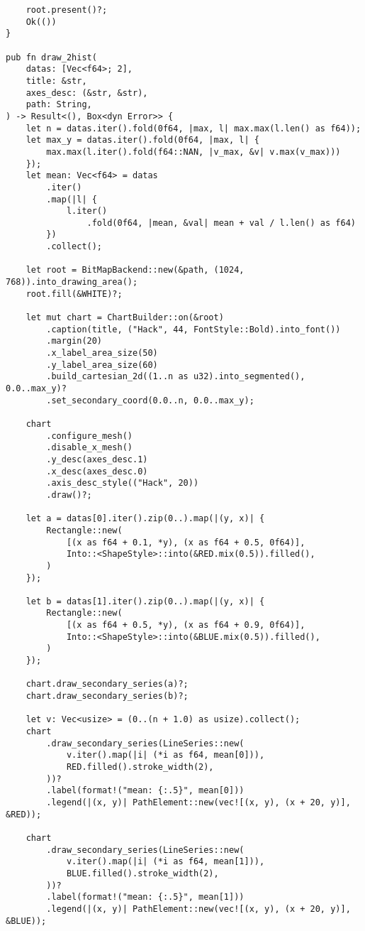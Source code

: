 \begin{verbatim}
    root.present()?;
    Ok(())
}

pub fn draw_2hist(
    datas: [Vec<f64>; 2],
    title: &str,
    axes_desc: (&str, &str),
    path: String,
) -> Result<(), Box<dyn Error>> {
    let n = datas.iter().fold(0f64, |max, l| max.max(l.len() as f64));
    let max_y = datas.iter().fold(0f64, |max, l| {
        max.max(l.iter().fold(f64::NAN, |v_max, &v| v.max(v_max)))
    });
    let mean: Vec<f64> = datas
        .iter()
        .map(|l| {
            l.iter()
                .fold(0f64, |mean, &val| mean + val / l.len() as f64)
        })
        .collect();

    let root = BitMapBackend::new(&path, (1024, 768)).into_drawing_area();
    root.fill(&WHITE)?;

    let mut chart = ChartBuilder::on(&root)
        .caption(title, ("Hack", 44, FontStyle::Bold).into_font())
        .margin(20)
        .x_label_area_size(50)
        .y_label_area_size(60)
        .build_cartesian_2d((1..n as u32).into_segmented(), 0.0..max_y)?
        .set_secondary_coord(0.0..n, 0.0..max_y);

    chart
        .configure_mesh()
        .disable_x_mesh()
        .y_desc(axes_desc.1)
        .x_desc(axes_desc.0)
        .axis_desc_style(("Hack", 20))
        .draw()?;

    let a = datas[0].iter().zip(0..).map(|(y, x)| {
        Rectangle::new(
            [(x as f64 + 0.1, *y), (x as f64 + 0.5, 0f64)],
            Into::<ShapeStyle>::into(&RED.mix(0.5)).filled(),
        )
    });

    let b = datas[1].iter().zip(0..).map(|(y, x)| {
        Rectangle::new(
            [(x as f64 + 0.5, *y), (x as f64 + 0.9, 0f64)],
            Into::<ShapeStyle>::into(&BLUE.mix(0.5)).filled(),
        )
    });

    chart.draw_secondary_series(a)?;
    chart.draw_secondary_series(b)?;

    let v: Vec<usize> = (0..(n + 1.0) as usize).collect();
    chart
        .draw_secondary_series(LineSeries::new(
            v.iter().map(|i| (*i as f64, mean[0])),
            RED.filled().stroke_width(2),
        ))?
        .label(format!("mean: {:.5}", mean[0]))
        .legend(|(x, y)| PathElement::new(vec![(x, y), (x + 20, y)], &RED));

    chart
        .draw_secondary_series(LineSeries::new(
            v.iter().map(|i| (*i as f64, mean[1])),
            BLUE.filled().stroke_width(2),
        ))?
        .label(format!("mean: {:.5}", mean[1]))
        .legend(|(x, y)| PathElement::new(vec![(x, y), (x + 20, y)], &BLUE));


\end{verbatim}
